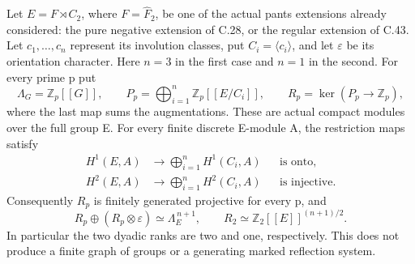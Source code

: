 Let \(E=F\rtimes C_2\), where \(F=\widehat F_2\), be
one of the actual pants extensions already considered: the pure
negative extension of C.28, or the regular extension of C.43.
Let \(c_1,\ldots,c_n\) represent its involution classes, put
\(C_i=\langle c_i\rangle\), and let \(\varepsilon\)
be its orientation character. Here \(n=3\) in the first case
and \(n=1\) in the second. For every prime p put
\[
 \Lambda_G=\mathbb Z_p[[G]],\qquad
 P_p=\bigoplus_{i=1}^n\mathbb Z_p[[E/C_i]],\qquad
 R_p=\ker(P_p\longrightarrow\mathbb Z_p),
 \tag{A.82.1}
\]
where the last map sums the augmentations. These are actual
compact modules over the full group E. For every finite discrete
E-module A, the restriction maps satisfy
\[
 \begin{aligned}
 H^1(E,A)&\longrightarrow\bigoplus_{i=1}^n H^1(C_i,A)
                    &&\text{is onto},\\
 H^2(E,A)&\longrightarrow\bigoplus_{i=1}^n H^2(C_i,A)
                    &&\text{is injective}.
 \end{aligned}
 \tag{A.82.2}
\]
Consequently \(R_p\) is finitely generated projective for
every p, and
\[
 R_p\oplus(R_p\otimes\varepsilon)\simeq\Lambda_E^{\,n+1},
 \qquad
 R_2\simeq\mathbb Z_2[[E]]^{(n+1)/2}.
 \tag{A.82.3}
\]
In particular the two dyadic ranks are two and one, respectively.
This does not produce a finite graph of groups or a generating
marked reflection system.

